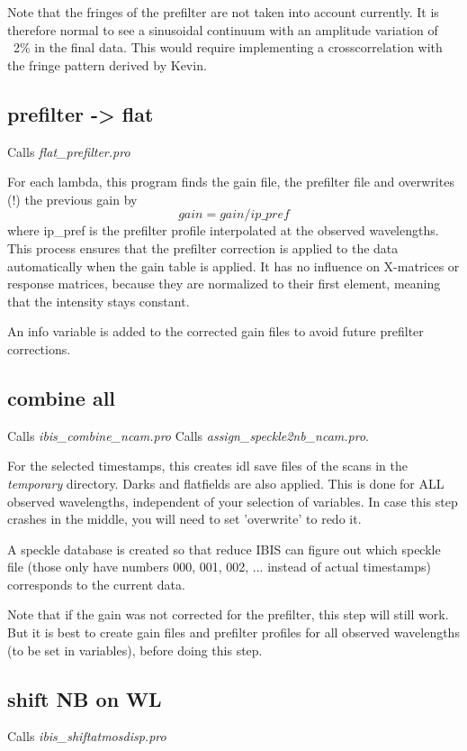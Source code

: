 \documentclass[a4paper,12pt]{article}
\begin{document}
Note that the fringes of the prefilter are not taken into account currently. It is therefore normal to see a sinusoidal continuum with an amplitude variation of ~2\% in the final data. This would require implementing a crosscorrelation with the fringe pattern derived by Kevin.

\subsection{prefilter -> flat}
Calls \textit{flat\_prefilter.pro}

For each lambda, this program finds the gain file, the prefilter file and overwrites (!) the previous gain by
$$gain = gain / ip\_pref $$ where ip\_pref is the prefilter profile interpolated at the observed wavelengths.
This process ensures that the prefilter correction is applied to the data automatically when the gain table is applied. It has no influence on X-matrices or response matrices, because they are normalized to their first element, meaning that the intensity stays constant.

An info variable is added to the corrected gain files to avoid future prefilter corrections.



\subsection{combine all}
Calls \textit{ibis\_combine\_ncam.pro} 
Calls \textit{assign\_speckle2nb\_ncam.pro}.

For the selected timestamps, this creates idl save files of the scans
in the \textit{temporary} directory. Darks and flatfields are also
applied. This is done for ALL observed wavelengths, independent of your selection of variables. In case this step crashes in the middle, you will need to set 'overwrite' to redo it.

A speckle database is created so that reduce IBIS can figure out which
speckle file (those only have numbers 000, 001, 002, ... instead of
actual timestamps) corresponds to the current data.

Note that if the gain was not corrected for the prefilter, this step will still work. But it is best to create gain files and prefilter profiles for all observed wavelengths (to be set in variables), before doing this step.


\subsection{shift NB on WL}
Calls \textit{ibis\_shiftatmosdisp.pro} 
\end{document}
